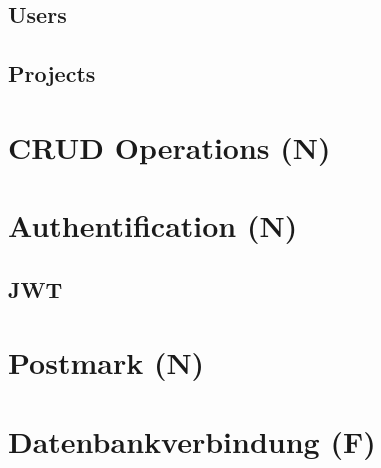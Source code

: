 \subsection{Users}


\subsection{Projects}


\section{CRUD Operations (N)}


\section{Authentification (N)}


\subsection{JWT}


\section{Postmark (N)}


\section{Datenbankverbindung (F)}
